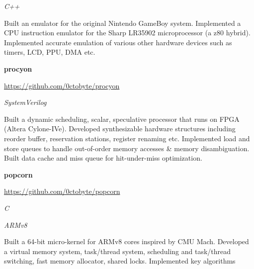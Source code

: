 \documentclass{article}
\newenvironment{colorheading}{\fontfamily{phv}\selectfont\bfseries\normalsize\color{darkcyan}}{\par}
\newenvironment{genericbody}{\fontfamily{phv}\selectfont\footnotesize\raggedright}{\par}
\newenvironment{metadata}{\fontfamily{phv}\selectfont\itshape\footnotesize\color{darkgray}}{\par}
\newenvironment{experience}[2]%
{%
  \begin{minipage}{0.71\linewidth}\raggedright#1\end{minipage}%
  \hfill%
  \begin{minipage}{0.28\linewidth}\raggedleft#2\end{minipage}%
}%
{\par}
\begin{document}
\begin{minipage}[t]{0.67\linewidth}
\begin{experience}
{    }
    {
      \begin{metadata}C++\end{metadata}
    }
    \end{experience}
    \begin{genericbody}
      Built an emulator for the original Nintendo GameBoy system. Implemented a CPU instruction emulator for the Sharp LR35902
      microprocessor (a z80 hybrid). Implemented accurate emulation of various other hardware devices such as timers, LCD, PPU, DMA etc.
    \end{genericbody}
    \medskip
    \begin{experience}
    {
      \begin{colorheading}procyon\end{colorheading}
      \begin{genericbody}\url{https://github.com/0ctobyte/procyon}\end{genericbody}
    }
    {
      \begin{metadata}SystemVerilog\end{metadata}
    }
    \end{experience}
    \begin{genericbody}
      Built a dynamic scheduling, scalar, speculative processor that runs on FPGA (Altera Cylone-IVe). Developed synthesizable
      hardware structures including reorder buffer, reservation stations, register renaming etc. Implemented load and store
      queues to handle out-of-order memory accesses \& memory disambiguation. Built data cache and miss queue for hit-under-miss
      optimization.
    \end{genericbody}
    \medskip
    \begin{experience}
    {
      \begin{colorheading}popcorn\end{colorheading}
      \begin{genericbody}\url{https://github.com/0ctobyte/popcorn}\end{genericbody}
    }
    {
      \begin{metadata}C\end{metadata}
      \begin{metadata}ARMv8\end{metadata}
    }
    \end{experience}
    \begin{genericbody}
      Built a 64-bit micro-kernel for ARMv8 cores inspired by CMU Mach. Developed a virtual memory system,
      task/thread system, scheduling and task/thread switching, fast memory allocator, shared locks. Implemented key algorithms

\end{genericbody}
\end{minipage}
\end{document}
